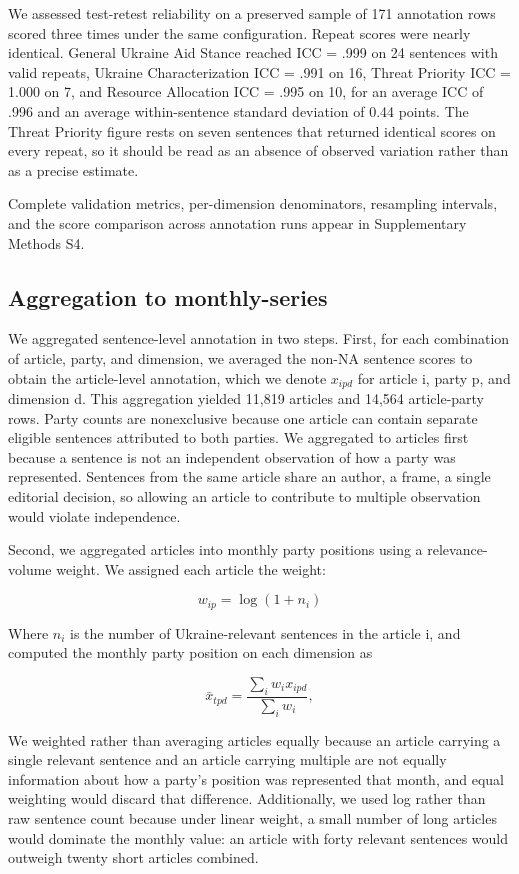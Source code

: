 We assessed test-retest reliability on a preserved sample of 171 annotation rows scored three times under the same configuration. Repeat scores were nearly identical. General Ukraine Aid Stance reached ICC = .999 on 24 sentences with valid repeats, Ukraine Characterization ICC = .991 on 16, Threat Priority ICC = 1.000 on 7, and Resource Allocation ICC = .995 on 10, for an average ICC of .996 and an average within-sentence standard deviation of 0.44 points. The Threat Priority figure rests on seven sentences that returned identical scores on every repeat, so it should be read as an absence of observed variation rather than as a precise estimate.

Complete validation metrics, per-dimension denominators, resampling intervals, and the score comparison across annotation runs appear in Supplementary Methods S4.

\subsection{Aggregation to monthly-series}

We aggregated sentence-level annotation in two steps. First, for each combination of article, party, and dimension, we averaged the non-NA sentence scores to obtain the article-level annotation, which we denote $x_{ipd}$ for article i, party p, and dimension d. This aggregation yielded 11,819 articles and 14,564 article-party rows. Party counts are nonexclusive because one article can contain separate eligible sentences attributed to both parties. We aggregated to articles first because a sentence is not an independent observation of how a party was represented. Sentences from the same article share an author, a frame, a single editorial decision, so allowing an article to contribute to multiple observation would violate independence.

Second, we aggregated articles into monthly party positions using a relevance-volume weight. We assigned each article the weight:

\[w_{ip}=\log(1+n_{i})\]

Where $n_{i}$ is the number of Ukraine-relevant sentences in the article i, and computed the monthly party position on each dimension as

\[{\bar{x}}_{tpd}=\frac{\sum_{i} w_{i}x_{ipd}}{\sum_{i} w_{i}},\]

We weighted rather than averaging articles equally because an article carrying a single relevant sentence and an article carrying multiple are not equally information about how a party's position was represented that month, and equal weighting would discard that difference. Additionally, we used log rather than raw sentence count because under linear weight, a small number of long articles would dominate the monthly value: an article with forty relevant sentences would outweigh twenty short articles combined.

